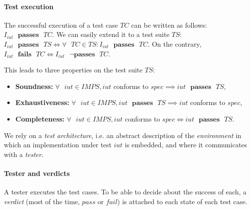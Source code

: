\paragraph{Test execution} The successful execution of a test
case $TC$ can be written as follows: $I_{iut} \text{ }
\mathbf{passes} \text{ } TC$. We can easily extend it to a test
suite $TS$: $I_{iut} \text{ } \mathbf{passes} \text{ } TS
\Leftrightarrow \forall \text{ } TC \in TS : I_{iut} \text{ }
\mathbf{passes} \text{ } TC$. On the contrary, $I_{iut} \text{ }
\mathbf{fails} \text{ } TC \Leftrightarrow I_{iut} \text{ } \neg
\mathbf{passes} \text{ } TC$.

This leads to three properties on the test suite $TS$:

\begin{itemize}
\item \textbf{Soundness:} $\forall \text{ } iut \in IMPS, iut$
conforms to $spec \implies iut \text{ } \mathbf{passes} \text{ }
TS$,

\item \textbf{Exhaustiveness:} $\forall \text{ } iut \in IMPS,
iut \text{ } \mathbf{passes} \text{ } TS \implies iut$ conforms
to $spec$,

\item \textbf{Completeness:} $\forall \text{ } iut \in IMPS, iut$
conforms to $spec \Leftrightarrow iut \text{ } \mathbf{passes}
\text{ } TS$.
\end{itemize}

We rely on a \textit{test architecture}, i.e. an abstract
description of the \textit{environment} in which an
implementation under test $iut$ is embedded, and where it
communicates with a \textit{tester}.

\paragraph{Tester and verdicts} A tester executes the test cases.
To be able to decide about the success of each, a
\textit{verdict} (most of the time, $pass$ or $fail$) is attached
to each state of each test case.
